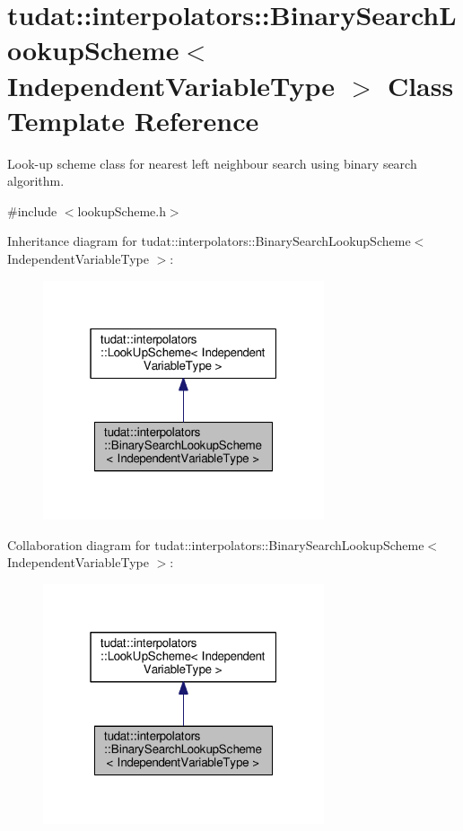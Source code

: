 \hypertarget{classtudat_1_1interpolators_1_1BinarySearchLookupScheme}{}\section{tudat\+:\+:interpolators\+:\+:Binary\+Search\+Lookup\+Scheme$<$ Independent\+Variable\+Type $>$ Class Template Reference}
\label{classtudat_1_1interpolators_1_1BinarySearchLookupScheme}


Look-\/up scheme class for nearest left neighbour search using binary search algorithm.  




{\ttfamily \#include $<$lookup\+Scheme.\+h$>$}



Inheritance diagram for tudat\+:\+:interpolators\+:\+:Binary\+Search\+Lookup\+Scheme$<$ Independent\+Variable\+Type $>$\+:
\nopagebreak
\begin{figure}[H]
\begin{center}
\leavevmode
\includegraphics[width=235pt]{classtudat_1_1interpolators_1_1BinarySearchLookupScheme__inherit__graph}
\end{center}
\end{figure}


Collaboration diagram for tudat\+:\+:interpolators\+:\+:Binary\+Search\+Lookup\+Scheme$<$ Independent\+Variable\+Type $>$\+:
\nopagebreak
\begin{figure}[H]
\begin{center}
\leavevmode
\includegraphics[width=235pt]{classtudat_1_1interpolators_1_1BinarySearchLookupScheme__coll__graph}
\end{center}
\end{figure}
